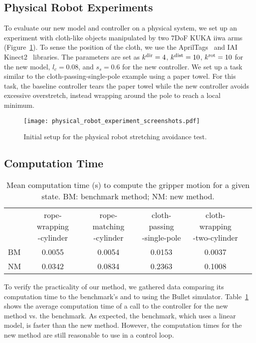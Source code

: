 \subsection{Physical Robot Experiments}

To evaluate our new model and controller on a physical system, we set up an experiment with cloth-like objects manipulated by two 7DoF KUKA iiwa arms (Figure~\ref{fig:physical_experiment_screenshots_ctl}). To sense the position of the cloth, we use the AprilTags~\cite{olson2011tags} and IAI Kinect2~\cite{iai_kinect2} libraries. The parameters are set as $k^\textrm{dir} = 4$, $k^\textrm{dist} = 10$, $k^{\textrm{rot}} = 10$ for the new model, $l_c = 0.08$, and $s_s = 0.6$ for the new controller. We set up a task similar to the cloth-passing-single-pole example using a paper towel. For this task, the baseline controller tears the paper towel while the new controller avoids excessive overstretch, instead wrapping around the pole to reach a local minimum.

\begin{figure}[t]
    \centering
    \texttt{[image: physical\_robot\_experiment\_screenshots.pdf]}
    \caption{Initial setup for the physical robot stretching avoidance test.}
    \label{fig:physical_experiment_screenshots_ctl}
\end{figure}


\subsection{Computation Time}

\begin{table}[t]
\centering
\caption{Mean computation time (s) to compute the gripper motion for a given state. BM: benchmark method; NM: new method.}
\begin{tabular}{lccccc}
\hline
        & \makecell{rope-wrapping\\-cylinder} 
        & \makecell{rope-matching\\-cylinder}
        & \makecell{cloth-passing\\-single-pole}
        & \makecell{cloth-wrapping\\-two-cylinder} \\
BM      & 0.0055   & 0.0054  & 0.0153  & 0.0037   \\ \hline
NM      & 0.0342   & 0.0834  & 0.2363  & 0.1008   \\ \hline
\end{tabular}
\label{tbl:constraint_controller_time_report}
\end{table}

To verify the practicality of our method, we gathered data comparing its computation time to the benchmark's and to using the Bullet simulator. Table~\ref{tbl:constraint_controller_time_report} shows the average computation time of a call to the controller for the new method vs. the benchmark. As expected, the benchmark, which uses a linear model, is faster than the new method. However, the computation times for the new method are still reasonable to use in a control loop.
